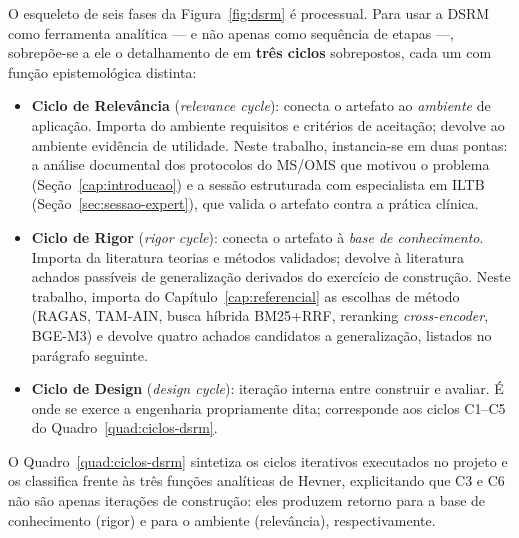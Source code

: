 \documentclass[
  12pt,
  oneside,
  a4paper,
  english,
  brazil
]{abntex2}
\begin{document}
O esqueleto de seis fases da Figura~\ref{fig:dsrm} é processual.
Para usar a DSRM como ferramenta analítica --- e não apenas como
sequência de etapas ---, sobrepõe-se a ele o detalhamento de
\citeauthor{hevner2007} \cite{hevner2007} em \textbf{três ciclos}
sobrepostos, cada um com função epistemológica distinta:

\begin{itemize}
  \item \textbf{Ciclo de Relevância} (\emph{relevance cycle}): conecta
        o artefato ao \emph{ambiente} de aplicação. Importa do ambiente
        requisitos e critérios de aceitação; devolve ao ambiente
        evidência de utilidade. Neste trabalho, instancia-se em duas
        pontas: a análise documental dos protocolos do MS/OMS que
        motivou o problema (Seção~\ref{cap:introducao}) e a sessão
        estruturada com especialista em ILTB
        (Seção~\ref{sec:sessao-expert}), que valida o artefato contra
        a prática clínica.
  \item \textbf{Ciclo de Rigor} (\emph{rigor cycle}): conecta o
        artefato à \emph{base de conhecimento}. Importa da literatura
        teorias e métodos validados; devolve à literatura achados
        passíveis de generalização derivados do exercício de
        construção. Neste trabalho, importa do
        Capítulo~\ref{cap:referencial} as escolhas de método (RAGAS,
        TAM-AIN, busca híbrida BM25+RRF, reranking
        \emph{cross-encoder}, BGE-M3) e devolve quatro achados
        candidatos a generalização, listados no parágrafo seguinte.
  \item \textbf{Ciclo de Design} (\emph{design cycle}): iteração
        interna entre construir e avaliar. É onde se exerce a
        engenharia propriamente dita; corresponde aos ciclos C1--C5
        do Quadro~\ref{quad:ciclos-dsrm}.
\end{itemize}

O Quadro~\ref{quad:ciclos-dsrm} sintetiza os ciclos iterativos
executados no projeto e os classifica frente às três funções
analíticas de Hevner, explicitando que C3 e C6 não são apenas
iterações de construção: eles produzem retorno para a base de
conhecimento (rigor) e para o ambiente (relevância),
respectivamente.
\end{document}
